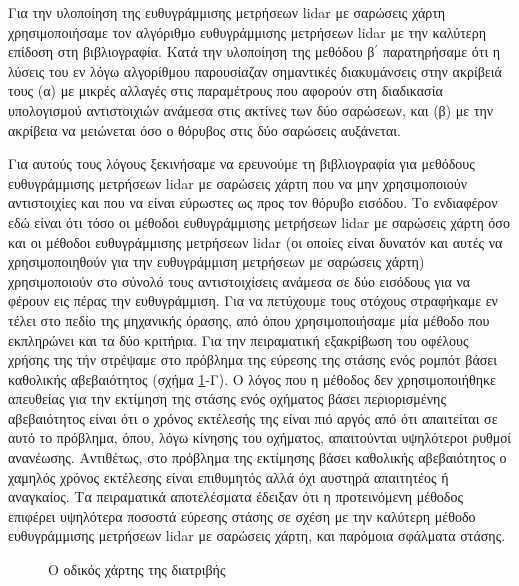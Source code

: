 Για την υλοποίηση της ευθυγράμμισης μετρήσεων lidar με σαρώσεις χάρτη
χρησιμοποιήσαμε τον αλγόριθμο ευθυγράμμισης μετρήσεων lidar με την καλύτερη
επίδοση στη βιβλιογραφία. Κατά την υλοποίηση της μεθόδου β$^\prime$ παρατηρήσαμε
ότι η λύσεις του εν λόγω αλγορίθμου παρουσίαζαν σημαντικές διακυμάνσεις στην
ακρίβειά τους (α) με μικρές αλλαγές στις παραμέτρους που αφορούν στη διαδικασία
υπολογισμού αντιστοιχιών ανάμεσα στις ακτίνες των δύο σαρώσεων, και (β) με την
ακρίβεια να μειώνεται όσο ο θόρυβος στις δύο σαρώσεις αυξάνεται.

Για αυτούς τους λόγους ξεκινήσαμε να ερευνούμε τη βιβλιογραφία για μεθόδους
ευθυγράμμισης μετρήσεων lidar με σαρώσεις χάρτη που να μην χρησιμοποιούν
αντιστοιχίες και που να είναι εύρωστες ως προς τον θόρυβο εισόδου. Το
ενδιαφέρον εδώ είναι ότι τόσο οι μέθοδοι ευθυγράμμισης μετρήσεων lidar με
σαρώσεις χάρτη όσο και οι μέθοδοι ευθυγράμμισης μετρήσεων lidar (οι οποίες
είναι δυνατόν και αυτές να χρησιμοποιηθούν για την ευθυγράμμιση μετρήσεων με
σαρώσεις χάρτη) χρησιμοποιούν στο σύνολό τους αντιστοιχίσεις ανάμεσα σε δύο
εισόδους για να φέρουν εις πέρας την ευθυγράμμιση. Για να πετύχουμε τους στόχους
στραφήκαμε εν τέλει στο πεδίο της μηχανικής όρασης, από όπου χρησιμοποιήσαμε
μία μέθοδο που εκπληρώνει και τα δύο κριτήρια. Για την πειραματική εξακρίβωση
του οφέλους χρήσης της τήν στρέψαμε στο πρόβλημα της εύρεσης της στάσης ενός
ρομπότ βάσει καθολικής αβεβαιότητος (σχήμα \ref{fig:roadmap}-Γ). Ο λόγος που η
μέθοδος δεν χρησιμοποιήθηκε απευθείας για την εκτίμηση της στάσης ενός οχήματος
βάσει περιορισμένης αβεβαιότητος είναι ότι ο χρόνος εκτέλεσής της είναι πιό
αργός από ότι απαιτείται σε αυτό το πρόβλημα, όπου, λόγω κίνησης του οχήματος,
απαιτούνται υψηλότεροι ρυθμοί ανανέωσης. Αντιθέτως, στο πρόβλημα της εκτίμησης
βάσει καθολικής αβεβαιότητος ο χαμηλός χρόνος εκτέλεσης είναι επιθυμητός αλλά
όχι αυστηρά απαιτητέος ή αναγκαίος. Τα πειραματικά αποτελέσματα έδειξαν ότι η
προτεινόμενη μέθοδος επιφέρει υψηλότερα ποσοστά εύρεσης στάσης σε σχέση με την
καλύτερη μέθοδο ευθυγράμμισης μετρήσεων lidar με σαρώσεις χάρτη, και παρόμοια
σφάλματα στάσης.






\begin{figure}\hspace{-2cm}
  
  \caption{Ο οδικός χάρτης της διατριβής}
  \label{fig:roadmap}
\end{figure}
